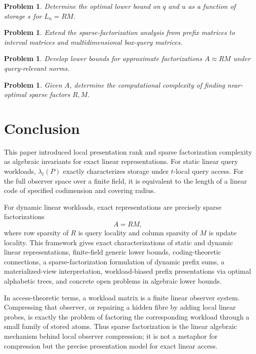 \documentclass[11pt]{article}
\newtheorem{problem}[theorem]{Problem}
\begin{document}
\begin{problem}
Determine the optimal lower bound on $q$ and $u$ as a function of storage $s$ for $L_n=RM$.
\end{problem}

\begin{problem}
Extend the sparse-factorization analysis from prefix matrices to interval matrices and multidimensional box-query matrices.
\end{problem}

\begin{problem}
Develop lower bounds for approximate factorizations $A\approx RM$ under query-relevant norms.
\end{problem}

\begin{problem}
Given $A$, determine the computational complexity of finding near-optimal sparse factors $R,M$.
\end{problem}

\section{Conclusion}

This paper introduced local presentation rank and sparse factorization complexity as algebraic invariants for exact linear representations. For static linear query workloads, $\lambda_t(P)$ exactly characterizes storage under $t$-local query access. For the full observer space over a finite field, it is equivalent to the length of a linear code of specified codimension and covering radius.

For dynamic linear workloads, exact representations are precisely sparse factorizations
\[
A=RM,
\]
where row sparsity of $R$ is query locality and column sparsity of $M$ is update locality. This framework gives exact characterizations of static and dynamic linear representations, finite-field generic lower bounds, coding-theoretic connections, a sparse-factorization formulation of dynamic prefix sums, a materialized-view interpretation, workload-biased prefix presentations via optimal alphabetic trees, and concrete open problems in algebraic lower bounds.

In access-theoretic terms, a workload matrix is a finite linear observer system. Compressing that observer, or repairing a hidden fibre by adding local linear probes, is exactly the problem of factoring the corresponding workload through a small family of stored atoms. Thus sparse factorization is the linear algebraic mechanism behind local observer compression; it is not a metaphor for compression but the precise presentation model for exact linear access.
\end{document}
